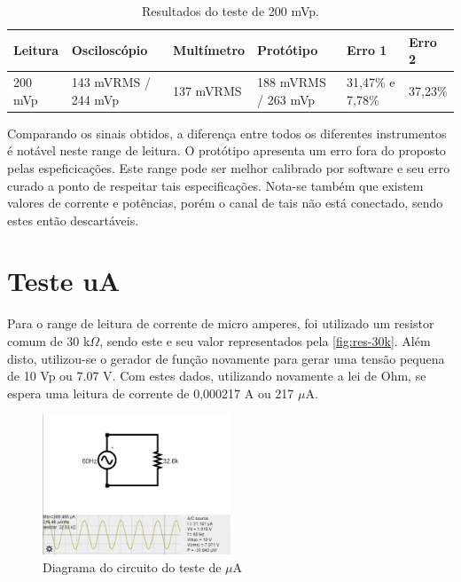 \begin{table}[!ht]
    \centering
    \caption{Resultados do teste de 200 mVp.}
    \label{tab:resultadoss-200}
    \begin{tabular}{|p{2cm}|p{3cm}|p{2cm}|p{2cm}|p{2cm}|p{2cm}|}
        \hline
        \textbf{Leitura} & \textbf{Osciloscópio} & \textbf{Multímetro} & \textbf{Protótipo}    & \textbf{Erro 1}  & \textbf{Erro 2}   \\ \hline
        200 mVp          & 143 mVRMS / 244 mVp   & 137 mVRMS           & 188 mVRMS / 263 mVp   & 31,47\% e 7,78\% & 37,23\%           \\ \hline
    \end{tabular}
\end{table}

Comparando os sinais obtidos, a diferença entre todos os diferentes instrumentos é notável neste range de leitura. O protótipo apresenta um erro fora do proposto pelas espeficicações. Este range pode ser melhor calibrado por software e seu erro curado a ponto de respeitar tais especificações. Nota-se também que existem valores de corrente e potências, porém o canal de tais não está conectado, sendo estes então descartáveis.

\section{Teste uA}\label{teste-ua}

Para o range de leitura de corrente de micro amperes, foi utilizado um resistor comum de 30 k$\Omega$, sendo este e seu valor representados pela \autoref{fig:res-30k}. Além disto, utilizou-se o gerador de função novamente para gerar uma tensão pequena de 10 Vp ou 7.07 V. Com estes dados, utilizando novamente a lei de Ohm, se espera uma leitura de corrente de 0,000217 A ou 217 $\mu$A.

\begin{figure}[htb!]
    \caption{Diagrama do circuito do teste de $\mu$A}
    \label{fig:circ-ua}
    \includegraphics[width=0.5\textwidth]{figuras/circ-ua-falstad.png}
    \fonte{}
\end{figure}

